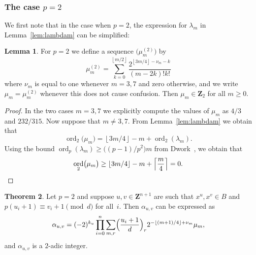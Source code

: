 \documentclass[a4paper,11pt]{article}
\numberwithin{equation}{section}
\providecommand{\floor}[1]{\left\lfloor#1\right\rfloor}   %
\providecommand{\ceil}[1]{\left\lceil#1\right\rceil}   %
\newcommand{\ZZ}{\mathbf{Z}} %
\DeclareMathOperator{\ord}{ord}          %
\theoremstyle{definition}
\newtheorem{thm}{Theorem}[section]
\newtheorem{lem}[thm]{Lemma}
\begin{document}
\subsubsection{The case $p = 2$}

We first note that in the case when $p = 2$, the expression for 
$\lambda_m$ in Lemma~\ref{lem:lambdam} can be simplified:

\begin{lem} \label{lem:mu2}
For $p = 2$ we define a sequence $\bigl(\mu_m^{(2)}\bigr)$ by 
\begin{equation*}
\mu_m^{(2)} = 
    \sum_{k=0}^{\floor{m/2}} \frac{2^{\floor{3m/4} - \nu_m - k}}{(m-2k)! k!}
\end{equation*}
where $\nu_m$ is equal to one whenever $m = 3, 7$ and zero otherwise, 
and we write $\mu_m =\mu_m^{(2)}$ whenever this does not cause confusion. 
Then $\mu_m \in \ZZ_2$ for all $m \geq 0$.
\end{lem}

\begin{proof}
In the two cases $m = 3, 7$ we explicitly compute the values of 
$\mu_m$ as $4/3$ and $232/315$.  Now suppose that $m \neq 3, 7$. 
From Lemma~\ref{lem:lambdam} we obtain that 
\begin{equation*}
\ord_2 \bigl(\mu_m\bigr) 
    = \floor{3m/4} - m + \ord_2(\lambda_m).
\end{equation*}
Using the bound $\ord_p(\lambda_m) \geq \bigl((p-1)/p^2\bigr) m$ from 
Dwork~\citep[pp.~55--57]{Dwork1962}, we obtain that 
\begin{equation*}
\ord_2 \bigl(\mu_m\bigr) 
    \geq \floor{3m/4} - m + \ceil{\frac{m}{4}} = 0. \qedhere
\end{equation*}
\end{proof}

\begin{thm} \label{thm:alpha2}
Let $p = 2$ and suppose $u, v \in \ZZ^{n+1}$ are such that 
$x^u, x^v \in B$ and $p (u_i + 1) \equiv v_i + 1 \pmod{d}$ 
for all~$i$.  Then $\alpha_{u,v}$ can be expressed as 
\begin{equation*}
\alpha_{u,v} = (-2)^{k_u} \prod_{i=0}^n \sum_{m,r} 
    \Bigl(\frac{u_i+1}{d}\Bigr)_r 2^{-\floor{(m+1)/4}+\nu_m} \mu_m, 
\end{equation*}
and $\alpha_{u,v}$ is a $2$-adic integer.
\end{thm}
\end{document}
